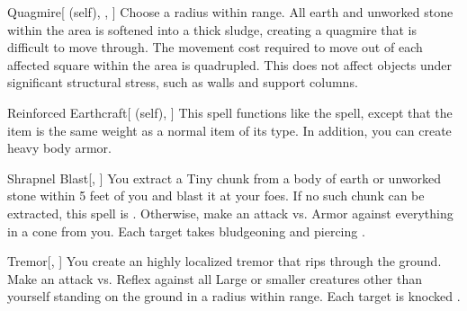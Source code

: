 \lowercase{\hypertarget{spell:Quagmire}{}}\label{spell:Quagmire}
\begin{attuneability}[\nth{2}]{\hypertarget{spell:Quagmire}{Quagmire}}[ (self), , ]
Choose a \areamed radius within \rngmed range.
All earth and unworked stone within the area is softened into a thick sludge, creating a quagmire that is difficult to move through.
The movement cost required to move out of each affected square within the area is quadrupled.
This does not affect objects under significant structural stress, such as walls and support columns.
\end{attuneability}
\vspace{0.25em}



\lowercase{\hypertarget{spell:Reinforced Earthcraft}{}}\label{spell:Reinforced Earthcraft}
\begin{attuneability}[\nth{2}]{\hypertarget{spell:Reinforced Earthcraft}{Reinforced Earthcraft}}[ (self), ]
This spell functions like the  spell, except that the item is the same weight as a normal item of its type.
In addition, you can create heavy body armor.
\end{attuneability}
\vspace{0.25em}



\lowercase{\hypertarget{spell:Shrapnel Blast}{}}\label{spell:Shrapnel Blast}
\begin{apability}[\nth{2}]{\hypertarget{spell:Shrapnel Blast}{Shrapnel Blast}}[, ]
You extract a Tiny chunk from a body of earth or unworked stone within 5 feet of you and blast it at your foes.
If no such chunk can be extracted, this spell is .
Otherwise, make an attack vs. Armor against everything in a \arealarge cone from you.
\hit Each target takes bludgeoning and piercing .
\end{apability}
\vspace{0.25em}



\lowercase{\hypertarget{spell:Tremor}{}}\label{spell:Tremor}
\begin{apability}[\nth{2}]{\hypertarget{spell:Tremor}{Tremor}}[, ]
You create an highly localized tremor that rips through the ground.
Make an attack vs. Reflex against all Large or smaller creatures other than yourself standing on the ground in a \areamed radius within \rngmed range.
\hit Each target is knocked .
\end{apability}
\vspace{0.25em}



